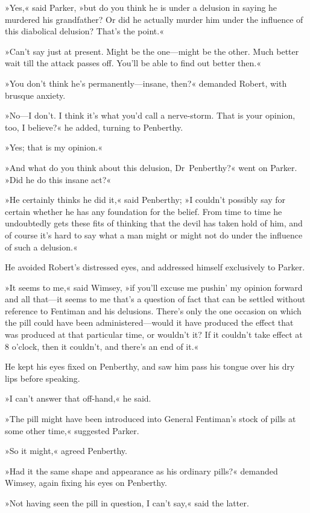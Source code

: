 »Yes,« said Parker, »but do you think he is under a delusion in saying he murdered his grandfather? Or did he actually murder him under the influence of this diabolical delusion? That's the point.«

»Can't say just at present. Might be the one—might be the other. Much better wait till the attack passes off. You'll be able to find out better then.«

»You don't think he's permanently—insane, then?« demanded Robert, with brusque anxiety.

»No—I don't. I think it's what you'd call a nerve-storm. That is your opinion, too, I believe?« he added, turning to Penberthy.

»Yes; that is my opinion.«

»And what do you think about this delusion, Dr~Penberthy?« went on Parker. »Did he do this insane act?«

»He certainly thinks he did it,« said Penberthy; »I couldn't possibly say for certain whether he has any foundation for the belief. From time to time he undoubtedly gets these fits of thinking that the devil has taken hold of him, and of course it's hard to say what a man might or might not do under the influence of such a delusion.«

He avoided Robert's distressed eyes, and addressed himself exclusively to Parker.

»It seems to me,« said Wimsey, »if you'll excuse me pushin' my opinion forward and all that—it seems to me that's a question of fact that can be settled without reference to Fentiman and his delusions. There's only the one occasion on which the pill could have been administered—would it have produced the effect that was produced at that particular time, or wouldn't it? If it couldn't take effect at 8 o'clock, then it couldn't, and there's an end of it.«

He kept his eyes fixed on Penberthy, and saw him pass his tongue over his dry lips before speaking.

»I can't answer that off-hand,« he said.

»The pill might have been introduced into General Fentiman's stock of pills at some other time,« suggested Parker.

»So it might,« agreed Penberthy.

»Had it the same shape and appearance as his ordinary pills?« demanded Wimsey, again fixing his eyes on Penberthy.

»Not having seen the pill in question, I can't say,« said the latter.

